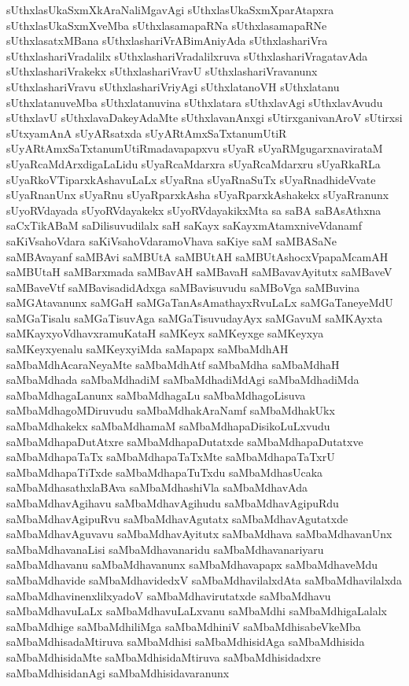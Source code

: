{sUthxlasUkaSxmXkAraNaliMgavAgi
sUthxlasUkaSxmXparAtapxra
sUthxlasUkaSxmXveMba
sUthxlasamapaRNa
sUthxlasamapaRNe
sUthxlasatxMBana
sUthxlashariVrABimAniyAda
sUthxlashariVra
sUthxlashariVradalilx
sUthxlashariVradalilxruva
sUthxlashariVragatavAda
sUthxlashariVrakekx
sUthxlashariVravU
sUthxlashariVravanunx
sUthxlashariVravu
sUthxlashariVriyAgi
sUthxlatanoVH
sUthxlatanu
sUthxlatanuveMba
sUthxlatanuvina
sUthxlatara
sUthxlavAgi
sUthxlavAvudu
sUthxlavU
sUthxlavaDakeyAdaMte
sUthxlavanAnxgi
sUtirxganivanAroV
sUtirxsi
sUtxyamAnA
sUyARsatxda
sUyARtAmxSaTxtanumUtiR
sUyARtAmxSaTxtanumUtiRmadavapapxvu
sUyaR
sUyaRMgugarxnavirataM
sUyaRcaMdArxdigaLaLidu
sUyaRcaMdarxra
sUyaRcaMdarxru
sUyaRkaRLa
sUyaRkoVTiparxkAshavuLaLx
sUyaRna
sUyaRnaSuTx
sUyaRnadhideVvate
sUyaRnanUnx
sUyaRnu
sUyaRparxkAsha
sUyaRparxkAshakekx
sUyaRranunx
sUyoRVdayada
sUyoRVdayakekx
sUyoRVdayakikxMta
sa
saBA
saBAsAthxna
saCxTikABaM
saDilisuvudilalx
saH
saKayx
saKayxmAtamxniveVdanamf
saKiVsahoVdara
saKiVsahoVdaramoVhava
saKiye
saM
saMBASaNe
saMBAvayanf
saMBAvi
saMBUtA
saMBUtAH
saMBUtAshocxVpapaMcamAH
saMBUtaH
saMBarxmada
saMBavAH
saMBavaH
saMBavavAyitutx
saMBaveV
saMBaveVtf
saMBavisadidAdxga
saMBavisuvudu
saMBoVga
saMBuvina
saMGAtavanunx
saMGaH
saMGaTanAsAmathayxRvuLaLx
saMGaTaneyeMdU
saMGaTisalu
saMGaTisuvAga
saMGaTisuvudayAyx
saMGavuM
saMKAyxta
saMKayxyoVdhavxramuKataH
saMKeyx
saMKeyxge
saMKeyxya
saMKeyxyenalu
saMKeyxyiMda
saMapapx
saMbaMdhAH
saMbaMdhAcaraNeyaMte
saMbaMdhAtf
saMbaMdha
saMbaMdhaH
saMbaMdhada
saMbaMdhadiM
saMbaMdhadiMdAgi
saMbaMdhadiMda
saMbaMdhagaLanunx
saMbaMdhagaLu
saMbaMdhagoLisuva
saMbaMdhagoMDiruvudu
saMbaMdhakAraNamf
saMbaMdhakUkx
saMbaMdhakekx
saMbaMdhamaM
saMbaMdhapaDisikoLuLxvudu
saMbaMdhapaDutAtxre
saMbaMdhapaDutatxde
saMbaMdhapaDutatxve
saMbaMdhapaTaTx
saMbaMdhapaTaTxMte
saMbaMdhapaTaTxrU
saMbaMdhapaTiTxde
saMbaMdhapaTuTxdu
saMbaMdhasUcaka
saMbaMdhasathxlaBAva
saMbaMdhashiVla
saMbaMdhavAda
saMbaMdhavAgihavu
saMbaMdhavAgihudu
saMbaMdhavAgipuRdu
saMbaMdhavAgipuRvu
saMbaMdhavAgutatx
saMbaMdhavAgutatxde
saMbaMdhavAguvavu
saMbaMdhavAyitutx
saMbaMdhava
saMbaMdhavanUnx
saMbaMdhavanaLisi
saMbaMdhavanaridu
saMbaMdhavanariyaru
saMbaMdhavanu
saMbaMdhavanunx
saMbaMdhavapapx
saMbaMdhaveMdu
saMbaMdhavide
saMbaMdhavidedxV
saMbaMdhavilalxdAta
saMbaMdhavilalxda
saMbaMdhavinenxlilxyadoV
saMbaMdhavirutatxde
saMbaMdhavu
saMbaMdhavuLaLx
saMbaMdhavuLaLxvanu
saMbaMdhi
saMbaMdhigaLalalx
saMbaMdhige
saMbaMdhiliMga
saMbaMdhiniV
saMbaMdhisabeVkeMba
saMbaMdhisadaMtiruva
saMbaMdhisi
saMbaMdhisidAga
saMbaMdhisida
saMbaMdhisidaMte
saMbaMdhisidaMtiruva
saMbaMdhisidadxre
saMbaMdhisidanAgi
saMbaMdhisidavaranunx
}
